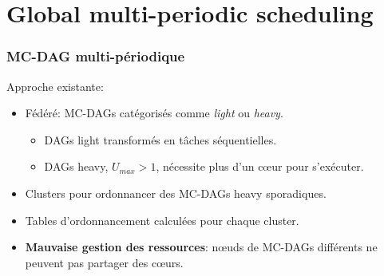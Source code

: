 \documentclass[xcolor=table]{beamer}
\begin{document}
\section {Global multi-periodic scheduling}
\newcommand{\light}[1]{\textcolor{gray}{#1}}

\begin{frame}
	\frametitle{MC-DAG multi-périodique}
	Approche existante:
	\begin{itemize}
		\item Fédéré: MC-DAGs catégorisés comme \emph{light} ou \emph{heavy}.
		\begin{itemize}
			\item DAGs light transformés en tâches séquentielles.
			\item DAGs heavy, $U_{max} > 1$, nécessite plus d'un c\oe{}ur pour s'exécuter.
		\end{itemize}
		\item Clusters pour ordonnancer des MC-DAGs heavy sporadiques.
		\item Tables d'ordonnancement calculées pour chaque cluster.
		\item \textbf{Mauvaise gestion des ressources}: n\oe{}uds de MC-DAGs différents ne peuvent pas 
		partager des c\oe{}urs.
	\end{itemize}
\end{frame}

\end{document}
